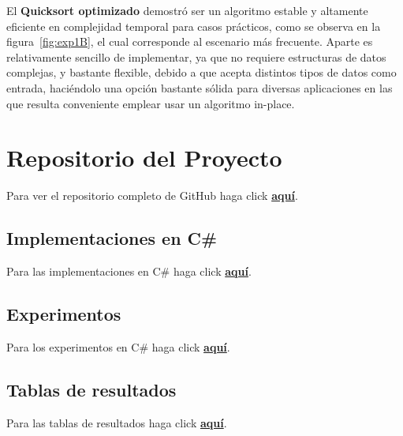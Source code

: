 \documentclass[conference]{IEEEtran}
\begin{document}
El \textbf{Quicksort optimizado} demostró ser un algoritmo estable y altamente eficiente en complejidad temporal para casos prácticos, como se observa en la figura~\ref{fig:exp1B}, el cual corresponde al escenario más frecuente. 
Aparte es relativamente sencillo de implementar, ya que no requiere estructuras de datos complejas,  y bastante flexible, debido a que acepta distintos tipos de datos como entrada,
haciéndolo una opción bastante sólida para diversas aplicaciones en las que resulta conveniente emplear usar un algoritmo in-place.





\appendices
\section{Repositorio del Proyecto}

Para ver el repositorio completo de GitHub haga click \href{https://github.com/PabloNatB/Comparativa-Quicksort}{\textbf{aquí}}.

\subsection{Implementaciones en C\#}
Para las implementaciones en C\# haga click \href{https://github.com/PabloNatB/Comparativa-Quicksort/blob/main/Qsort/Class1.cs}{\textbf{aquí}}.

\subsection{Experimentos}
Para los experimentos en C\# haga click \href{https://github.com/PabloNatB/Comparativa-Quicksort/blob/main/Qsort/Program.cs}{\textbf{aquí}}.

\subsection{Tablas de resultados}
Para las tablas de resultados haga click \href{https://github.com/PabloNatB/Comparativa-Quicksort/tree/main/Qsort/bin/Debug/net8.0}{\textbf{aquí}}.
\end{document}

